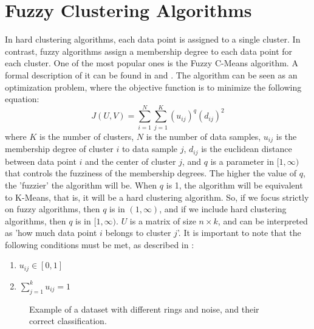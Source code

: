 \documentclass[conference]{IEEEtran}
\begin{document}
\section{Fuzzy Clustering Algorithms}
In hard clustering algorithms, each data point is assigned to a single cluster. In contrast, fuzzy algorithms assign a membership degree to each data point for each cluster.
One of the most popular ones is the Fuzzy C-Means algorithm. A formal description of it can be found in \cite{bookpatternrecognition} and \cite{BEZDEK1984191}. The algorithm can be seen as an optimization problem,
where the objective function is to minimize the following equation:
\begin{equation}
J(U, V) = \sum_{i=1}^{N} \sum_{j=1}^{K} (u_{ij})^q (d_{ij})^2
\end{equation}
where $K$ is the number of clusters, $N$ is the number of data samples, $u_{ij}$ is the membership degree of cluster $i$ to data sample $j$,
$d_{ij}$ is the euclidean distance between data point $i$ and the center of cluster $j$, and $q$ is a parameter in $[1, \infty)$ that controls the fuzziness of the membership degrees.
The higher the value of $q$, the 'fuzzier' the algorithm will be. When $q$ is 1, the algorithm will be equivalent to K-Means, that is, it will be a hard clustering algorithm.
So, if we focus strictly on fuzzy algorithms, then $q$ is in $(1, \infty)$, and if we include hard clustering algorithms, then $q$ is in $[1, \infty)$.
$U$ is a matrix of size $n \times k$, and can be interpreted as 'how much data point $i$ belongs to cluster $j$'.
It is important to note that the following conditions must be met, as described in \cite{BEZDEK1984191}:
\begin{enumerate}
    \item $u_{ij} \in [0, 1]$
    \item $\sum_{j=1}^{k} u_{ij} = 1$
\end{enumerate}

\begin{figure}[H]
    \centering
    \resizebox{0.9\linewidth}{!}{}
    \label{fig:noisy_rings}
    \caption{Example of a dataset with different rings and noise, and their correct classification.}
\end{figure}
\end{document}
